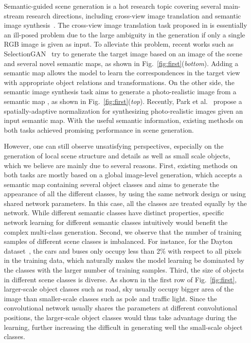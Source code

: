 \documentclass[10pt,twocolumn,letterpaper]{article}
\begin{document}
Semantic-guided scene generation is a hot research topic covering several main-stream research directions, including cross-view image translation \cite{isola2017image,zhai2017predicting,regmi2018cross,regmi2019cross,tang2019multi,regmi2019bridging} and semantic image synthesis~\cite{wang2018high, chen2017photographic, qi2018semi, park2019semantic}. 
The cross-view image translation task proposed in \cite{regmi2018cross} is essentially an ill-posed problem due to the large ambiguity in the generation if only a single RGB image is given as input. 
To alleviate this problem, recent works such as SelectionGAN~\cite{tang2019multi} try to generate the target image based on an image of the scene and several novel semantic maps, as shown in Fig.~\ref{fig:first}(\textit{bottom}).
Adding a semantic map allows the model to learn the correspondences in the target view with appropriate object relations and transformations.
On the other side, the semantic image synthesis task aims to generate a photo-realistic image from a semantic map 
\cite{wang2018high, chen2017photographic, qi2018semi, park2019semantic}, as shown in Fig.~\ref{fig:first}(\textit{top}). Recently, Park et al.~\cite{park2019semantic} propose a spatially-adaptive normalization for synthesizing photo-realistic images given an input semantic map.
With the useful semantic information, existing methods on both tasks achieved promising performance in scene generation.





However, one can still observe unsatisfying perspectives, especially on the generation of local scene structure and details as well as small scale objects, which we believe are mainly due to several reasons.
First, existing methods on both tasks are mostly based on a global image-level generation, which accepts a semantic map containing several object classes and aims to generate the appearance of all the different classes, by using the same network design or using shared network parameters. In this case, all the classes are treated equally by the network. While different semantic classes have distinct properties, specific network learning for different semantic classes intuitively would benefit the complex multi-class generation. 
Second, we observe that the number of training samples of different scene classes is imbalanced.
For instance, for the Dayton dataset~\cite{vo2016localizing}, the cars and  buses only occupy less than 2\% with respect to all pixels in the training data, which naturally makes the model learning be dominated by the classes with the larger number of training samples. 
Third, the size of objects in different scene classes is diverse. As shown in the first row of Fig.~\ref{fig:first}, 
larger-scale object classes such as road, sky usually occupy bigger area of the image than smaller-scale classes such as pole and traffic light. Since the convolutional network usually shares the parameters at different convolutional positions, the larger-scale object classes would thus take advantage during the learning, further increasing the difficult in generating well the small-scale object classes.
\end{document}
